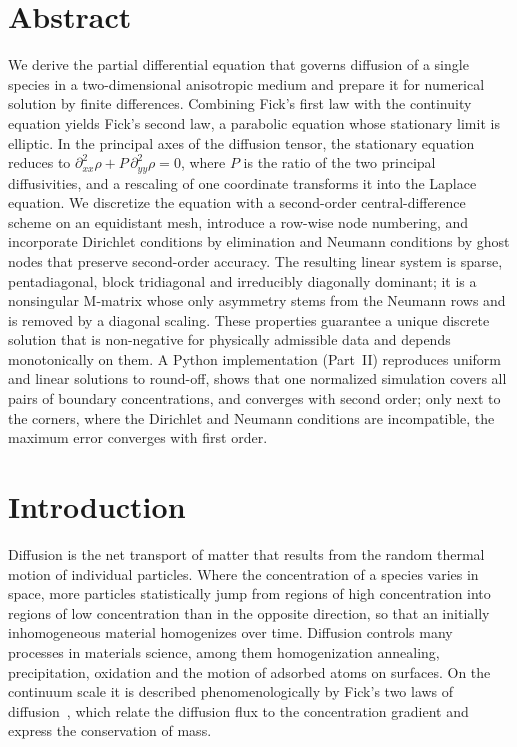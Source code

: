 \documentclass[11pt,a4paper]{article}
\numberwithin{equation}{section}
\theoremstyle{definition}
\theoremstyle{remark}
\begin{document}
\section*{Abstract}
  We derive the partial differential equation that governs diffusion of a single species
  in a two-dimensional anisotropic medium and prepare it for numerical solution by finite
  differences. Combining Fick's first law with the continuity equation yields Fick's
  second law, a parabolic equation whose stationary limit is elliptic. In the principal
  axes of the diffusion tensor, the stationary equation reduces to
  $\partial^2_{xx}\rho + P\,\partial^2_{yy}\rho = 0$, where $P$ is the ratio of the two
  principal diffusivities, and a rescaling of one coordinate transforms it into the
  Laplace equation. We discretize the equation with a second-order central-difference
  scheme on an equidistant mesh, introduce a row-wise node numbering, and incorporate
  Dirichlet conditions by elimination and Neumann conditions by ghost nodes that preserve
  second-order accuracy. The resulting linear system is sparse, pentadiagonal, block
  tridiagonal and irreducibly diagonally dominant; it is a nonsingular M-matrix whose
  only asymmetry stems from the Neumann rows and is removed by a diagonal scaling. These
  properties guarantee a unique discrete solution that is non-negative for physically
  admissible data and depends monotonically on them. A Python implementation (Part~II) reproduces
  uniform and linear solutions to round-off, shows that one normalized simulation covers all pairs
  of boundary concentrations, and converges with second order; only next to the corners, where the
  Dirichlet and Neumann conditions are incompatible, the maximum error converges with first order.

\tableofcontents
\clearpage

\section{Introduction}\label{sec:intro}

Diffusion is the net transport of matter that results from the random thermal motion of
individual particles. Where the concentration of a species varies in space, more
particles statistically jump from regions of high concentration into regions of low
concentration than in the opposite direction, so that an initially inhomogeneous material
homogenizes over time. Diffusion controls many processes in materials science, among them
homogenization annealing, precipitation, oxidation and the motion of adsorbed atoms on
surfaces. On the continuum scale it is described phenomenologically by Fick's two laws of
diffusion~\citep{fick1855, crank1975}, which relate the diffusion flux to the
concentration gradient and express the conservation of mass.
\end{document}
